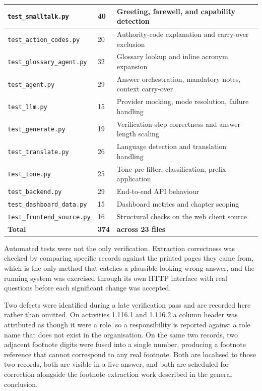 \begin{longtable}{|p{}|p{}|p{}|}
\texttt{test\_smalltalk.py} & 40 & Greeting, farewell, and capability detection \\ \hline
\texttt{test\_action\_codes.py} & 20 & Authority-code explanation and carry-over exclusion \\ \hline
\texttt{test\_glossary\_agent.py} & 32 & Glossary lookup and inline acronym expansion \\ \hline
\texttt{test\_agent.py} & 29 & Answer orchestration, mandatory notes, context carry-over \\ \hline
\texttt{test\_llm.py} & 15 & Provider mocking, mode resolution, failure handling \\ \hline
\texttt{test\_generate.py} & 19 & Verification-step correctness and answer-length scaling \\ \hline
\texttt{test\_translate.py} & 26 & Language detection and translation handling \\ \hline
\texttt{test\_tone.py} & 25 & Tone pre-filter, classification, prefix application \\ \hline
\texttt{test\_backend.py} & 29 & End-to-end API behaviour \\ \hline
\texttt{test\_dashboard\_data.py} & 15 & Dashboard metrics and chapter scoping \\ \hline
\texttt{test\_frontend\_source.py} & 16 & Structural checks on the web client source \\ \hline
\textbf{Total} & \textbf{374} & \textbf{across 23 files} \\ \hline
\end{longtable}

Automated tests were not the only verification. Extraction correctness was checked by comparing specific records against the printed pages they came from, which is the only method that catches a plausible-looking wrong answer, and the running system was exercised through its own HTTP interface with real questions before each significant change was accepted.

Two defects were identified during a late verification pass and are recorded here rather than omitted. On activities 1.116.1 and 1.116.2 a column header was attributed as though it were a role, so a responsibility is reported against a role name that does not exist in the organisation. On the same two records, two adjacent footnote digits were fused into a single number, producing a footnote reference that cannot correspond to any real footnote. Both are localised to those two records, both are visible in a live answer, and both are scheduled for correction alongside the footnote extraction work described in the general conclusion.

